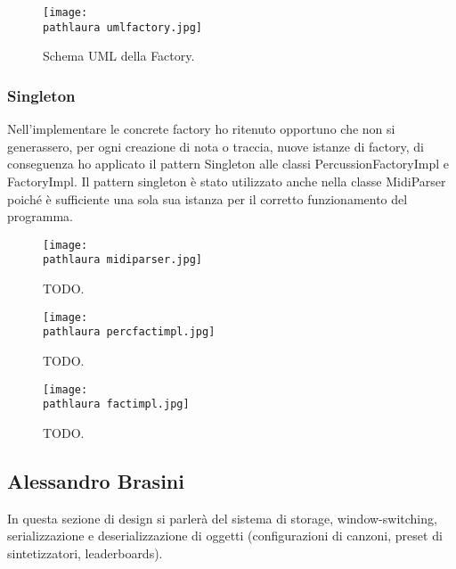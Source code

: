 \documentclass[a4paper,12pt]{report}
\newcommand\pathlaura{img/laura/}
\begin{document}
\begin{figure}[!htb]
	\centerline{\texttt{[image: \\pathlaura umlfactory.jpg]}}
	\caption{Schema UML della Factory.}
	\label{img:midifactory}
\end{figure}
\hfill\break\break\break\break\break\break

\subsubsection{Singleton}
Nell'implementare le concrete factory ho ritenuto opportuno che non si generassero, per ogni creazione di nota o traccia, nuove istanze di factory, di conseguenza ho applicato il pattern Singleton alle classi PercussionFactoryImpl e FactoryImpl. Il pattern singleton è stato utilizzato anche nella classe MidiParser poiché è sufficiente una sola sua istanza per il corretto funzionamento del programma.
\newpage

\begin{figure}[!htb]
	\centerline{\texttt{[image: \\pathlaura midiparser.jpg]}}
	\caption{TODO.}
	\label{img:midiparser}
\end{figure}  
\hfill\break\break
\begin{figure}[!htb]
	\centerline{\texttt{[image: \\pathlaura percfactimpl.jpg]}}
	\caption{TODO.}
	\label{img:percfactimpl}
\end{figure}
\hfill\break\break
\begin{figure}[!htb]
	\centerline{\texttt{[image: \\pathlaura factimpl.jpg]}}
	\caption{TODO.}
	\label{img:factimpl}
\end{figure}
\clearpage

\subsection{Alessandro Brasini}
In questa sezione di design si parlerà del sistema di storage, window-switching, serializzazione e deserializzazione di oggetti (configurazioni di canzoni, preset di sintetizzatori, leaderboards).  
\end{document}
